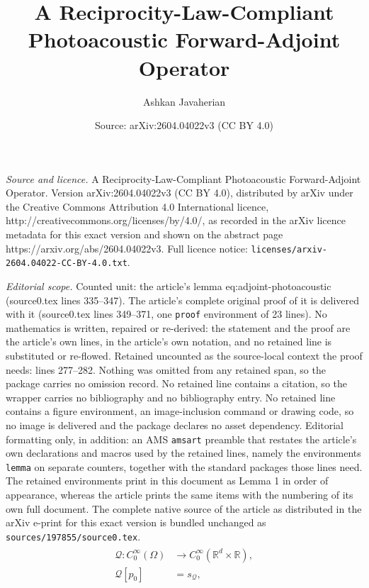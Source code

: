 \documentclass[10pt,a4paper]{amsart}
\title{A Reciprocity-Law-Compliant Photoacoustic Forward-Adjoint Operator}
\author{Ashkan Javaherian}
\date{Source: arXiv:2604.04022v3 (CC BY 4.0)}
\begin{document}
\maketitle

\noindent\emph{Source and licence.} A Reciprocity-Law-Compliant Photoacoustic Forward-Adjoint Operator. Version arXiv:2604.04022v3 (CC BY 4.0), distributed by arXiv under the Creative Commons Attribution 4.0 International licence, http://creativecommons.org/licenses/by/4.0/, as recorded in the arXiv licence metadata for this exact version and shown on the abstract page https://arxiv.org/abs/2604.04022v3. Full licence notice: \texttt{licenses/arxiv-2604.04022-CC-BY-4.0.txt}.\par\smallskip

\noindent\textit{Editorial scope.} Counted unit: the article's lemma eq:adjoint-photoacoustic (source0.tex lines 335--347). The article's complete original proof of it is delivered with it (source0.tex lines 349--371, one \texttt{proof} environment of 23 lines). No mathematics is written, repaired or re-derived: the statement and the proof are the article's own lines, in the article's own notation, and no retained line is substituted or re-flowed.  Retained uncounted as the source-local context the proof needs: lines 277--282.  Nothing was omitted from any retained span, so the package carries no omission record.  No retained line contains a citation, so the wrapper carries no bibliography and no bibliography entry.  No retained line contains a figure environment, an image-inclusion command or drawing code, so no image is delivered and the package declares no asset dependency.  Editorial formatting only, in addition: an AMS \texttt{amsart} preamble that restates the article's own declarations and macros used by the retained lines, namely the environments \texttt{lemma} on separate counters, together with the standard packages those lines need.  The retained environments print in this document as Lemma 1 in order of appearance, whereas the article prints the same items with the numbering of its own full document.  The complete native source of the article as distributed in the arXiv e-print for this exact version is bundled unchanged as \texttt{sources/197855/source0.tex}.
\begin{align} \label{eq:photoacoustic-op}
    \begin{split}
        \mathcal{Q}: C_0^{\infty}(\Omega) &\rightarrow C_0^{\infty}(\mathbb{R}^d \times \mathbb{R}), \\
        \mathcal{Q}[p_0] &= s_{\mathcal{Q}},
    \end{split}
\end{align}
\end{document}

